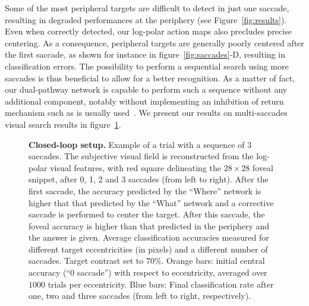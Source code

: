 
Some of the most peripheral targets are difficult to detect in just one saccade, resulting in degraded performances at the periphery (see Figure~\ref{fig:results}). Even when correctly detected, our log-polar action maps also precludes precise centering. As a consequence, peripheral targets are generally poorly centered after the first saccade, as shown for instance in figure~\ref{fig:saccades}-D, resulting in classification errors. The possibility to perform a sequential search using more saccades is thus beneficial to allow for a better recognition. As a matter of fact, our dual-pathway network is capable to perform such a sequence without any additional component, notably without implementing an inhibition of return mechanism such as is usually used~\cite{Itti01}. We present our results on multi-saccades visual search results in figure~\ref{fig:results-saccades}.


\begin{figure}[t!]%
	\caption{
		{\bf Closed-loop setup.} %
		\A Example of a trial with a sequence of 3 saccades. The subjective visual field  is reconstructed from the log-polar visual features, with red square delineating the $28\times28$ foveal snippet, after 0, 1, 2 and 3 saccades (from left to right). After the first saccade, the accuracy predicted by the ``Where'' network is higher that that predicted by the ``What'' network and a corrective saccade is performed to center the target. After this saccade, the foveal accuracy is higher than that predicted in the periphery and the answer \ANS is given. %
		\B Average classification accuracies measured for different target eccentricities (in pixels) and a different number of saccades. Target contrast set to $70\%$. Orange bars: initial central accuracy (``0 saccade'') with respect to eccentricity, averaged over $1000$ trials per eccentricity. Blue bars: Final classification rate after one, two and three saccades (from left to right, respectively).
		\label{fig:results-saccades}}%
\end{figure}%

